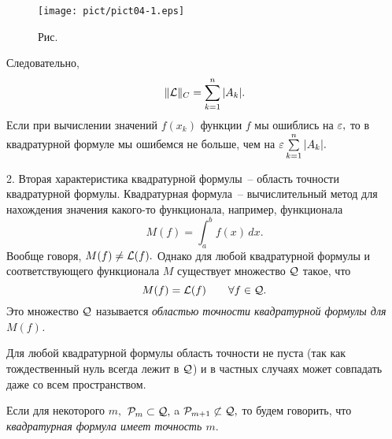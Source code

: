 


  \bigskip
\begin{figure}[ht]
\begin{center}
\texttt{[image: pict/pict04-1.eps]}
\end{center}
 \bigskip
 \label{r4-1}

 \centerline{Рис.~\theris}
 \bigskip
\end{figure}





\noindent Следовательно,
\[
 \|\mathcal{L} \|_C=\sum\limits_{k=1}^n |A_k|.
\]
Если при вычислении значений $f(x_k)$ функции $f$
мы ошиблись на ${\varepsilon },$ то в квадратурной формуле мы ошибемся
не больше, чем на ${\varepsilon } \sum\limits_{k=1}^n |A_k|.$

2. Вторая характеристика квадратурной формулы~-- область
точности квадратурной формулы.
Квадратурная формула~-- вычислительный метод для
нахождения значения какого-то функционала, например, функционала
\[
  M(f)=\int_a^b f(x) \,dx.
\]
Вообще говоря, $M(f) \ne \mathcal{L}(f).$
Однако для любой квадратурной формулы и соответствующего
функционала $M$ существует множество
$\mathcal{Q}$ такое, что
\[
  M(f) = \mathcal{L}(f) \qquad \forall f \in \mathcal{Q}.
\]
Это множество $\mathcal{Q}$ называется {\it областью точности квадратурной формулы для
$M(f)$.}

Для любой квадратурной формулы область точности не
пуста (так как тождественный нуль всегда лежит в
$\mathcal{Q}$) и в частных случаях может совпадать даже со всем пространством.

\begin{defi}
Если для некоторого $m,$ $\mathcal{P}_m \subset \mathcal{Q},$ {a $\mathcal{P}_{m+1}\not\subset \mathcal{Q},$} то будем говорить, что {\it
квадратурная формула имеет точность $m.$}
\end{defi}


